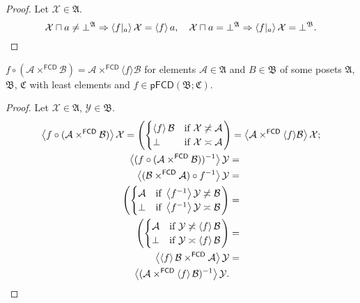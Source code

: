 \begin{proof}
Let $\mathcal{X}\in\mathfrak{A}$. 
\[
\mathcal{X}\sqcap a\neq\bot^{\mathfrak{A}}\Rightarrow\left\langle f|_{a}\right\rangle\mathcal{X}=\left\langle f\right\rangle a,\hspace{1em}\mathcal{X}\sqcap a=\bot^{\mathfrak{A}}\Rightarrow\left\langle f|_{a}\right\rangle\mathcal{X}=\bot^{\mathfrak{B}}.
\]
\end{proof}
\begin{prop}
$f\circ(\mathcal{A}\times^{\mathsf{FCD}}\mathcal{B})=\mathcal{A}\times^{\mathsf{FCD}}\langle f\rangle\mathcal{B}$
for elements $\mathcal{A}\in\mathfrak{A}$ and $B\in\mathfrak{B}$
of some posets $\mathfrak{A}$, $\mathfrak{B}$, $\mathfrak{C}$ with
least elements and $f\in\mathsf{pFCD}(\mathfrak{B};\mathfrak{C})$.\end{prop}
\begin{proof}
Let $\mathcal{X}\in\mathfrak{A}$, $\mathcal{Y}\in\mathfrak{B}$.
\begin{gather*}
\left\langle f\circ(\mathcal{A}\times^{\mathsf{FCD}}\mathcal{B})\right\rangle\mathcal{X}=\left(\begin{cases}
\left\langle f\right\rangle\mathcal{B} & \text{if }\mathcal{X}\not\asymp\mathcal{A}\\
\bot & \text{if }\mathcal{X}\asymp\mathcal{A}
\end{cases}\right)=\left\langle \mathcal{A}\times^{\mathsf{FCD}}\langle f\rangle\mathcal{B}\right\rangle\mathcal{X};\\
\begin{aligned}\left\langle (f\circ(\mathcal{A}\times^{\mathsf{FCD}}\mathcal{B}))^{-1}\right\rangle\mathcal{Y} & =\\
\left\langle (\mathcal{B}\times^{\mathsf{FCD}}\mathcal{A})\circ f^{-1}\right\rangle\mathcal{Y} & =\\
\left(\begin{cases}
\mathcal{A} & \text{if }\left\langle f^{-1}\right\rangle\mathcal{Y}\not\asymp\mathcal{B}\\
\bot & \text{if }\left\langle f^{-1}\right\rangle\mathcal{Y}\asymp\mathcal{B}
\end{cases}\right) & =\\
\left(\begin{cases}
\mathcal{A} & \text{if }\mathcal{Y}\not\asymp\left\langle f\right\rangle\mathcal{B}\\
\bot & \text{if }\mathcal{Y}\asymp\left\langle f\right\rangle\mathcal{B}
\end{cases}\right) & =\\
\left\langle \left\langle f\right\rangle\mathcal{B}\times^{\mathsf{FCD}}\mathcal{A}\right\rangle\mathcal{Y} & =\\
\left\langle (\mathcal{A}\times^{\mathsf{FCD}}\left\langle f\right\rangle\mathcal{B})^{-1}\right\rangle\mathcal{Y}.
\end{aligned}
\end{gather*}

\end{proof}

